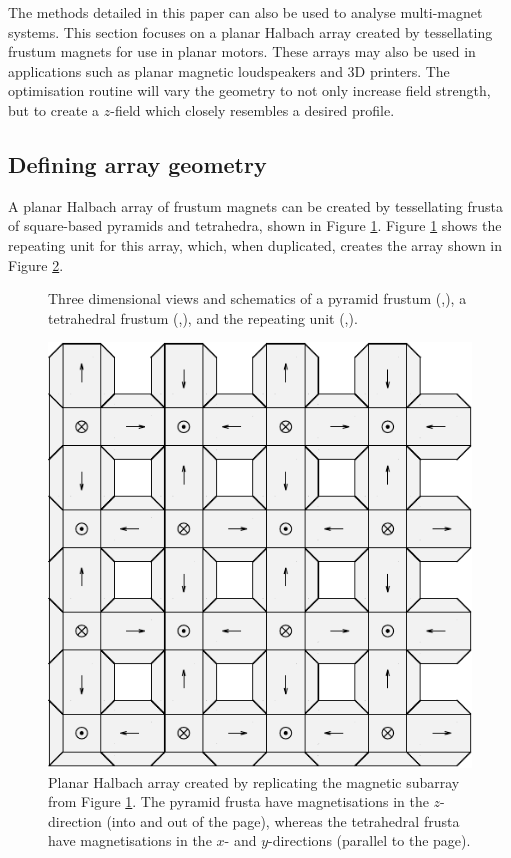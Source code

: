 The methods detailed in this paper can also be used to analyse multi-magnet systems. This section focuses on a planar Halbach array created by tessellating frustum magnets for use in planar motors. These arrays may also be used in applications such as planar magnetic loudspeakers and 3D printers. The optimisation routine will vary the geometry to not only increase field strength, but to create a \(z\)-field which closely resembles a desired profile.

\subsection{Defining array geometry}
A planar Halbach array of frustum magnets can be created by tessellating frusta of square-based pyramids and tetrahedra, shown in Figure \ref{fig:p3halbachFrustumGeometry}. Figure \ref{fig:p3halbachFrustumGeometry} shows the repeating unit for this array, which, when duplicated, creates the array shown in Figure \ref{fig:p3planarHalbach}.
\begin{figure}
	\centering
	
	\caption{Three dimensional views and schematics of a pyramid frustum (,), a tetrahedral frustum (,), and the repeating unit (,).}
	\label{fig:p3halbachFrustumGeometry}
\end{figure}
\begin{figure}
	\centering
	\includegraphics[width=0.7\linewidth]{p3/p3FIG11}
	\caption{Planar Halbach array created by replicating the magnetic subarray from Figure \ref{fig:p3halbachFrustumGeometry}. The pyramid frusta have magnetisations in the \(z\)-direction (into and out of the page), whereas the tetrahedral frusta have magnetisations in the \(x\)- and \(y\)-directions (parallel to the page).}
	\label{fig:p3planarHalbach}
\end{figure}

